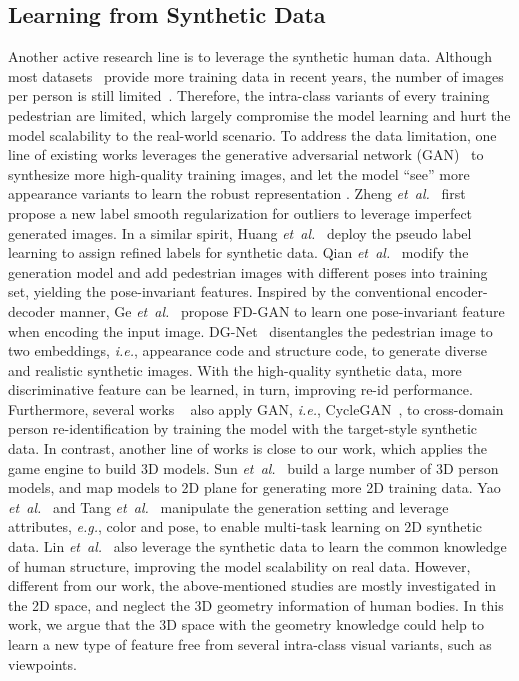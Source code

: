 \documentclass[journal]{IEEEtran}
\def\eg{\emph{e.g.}}
\def\ie{\emph{i.e.}}
\def\etal{\emph{et~al.}}
\begin{document}
\subsection{Learning from Synthetic Data}
Another active research line is to leverage the synthetic human data. Although most datasets~\cite{zheng2015scalable,ristani2016performance} provide more training data in recent years, the number of images per person is still limited~\cite{zheng2017unlabeled}. Therefore, the intra-class variants of every training pedestrian are limited, which largely compromise the model learning and hurt the model scalability to the real-world scenario. To address the data limitation, one line of existing works leverages the generative adversarial network (GAN)~\cite{goodfellow2014generative} to synthesize more high-quality training images, and let the model ``see'' more appearance variants to learn the robust representation \cite{zheng2019joint,ge2018fd,eom2019learning,qian2018pose,zheng2017unlabeled,liu2018pose,zhong2018camera,zou2020joint}. Zheng \etal~\cite{zheng2017unlabeled} first propose a new label smooth regularization for outliers to leverage imperfect generated images. In a similar spirit, Huang \etal~\cite{huang2018multi} deploy the pseudo label learning to assign refined labels for synthetic data. Qian \etal~\cite{qian2018pose} modify the generation model and add pedestrian images with different poses into training set, yielding the pose-invariant features. 
Inspired by the conventional encoder-decoder manner, Ge \etal~\cite{ge2018fd} propose FD-GAN to learn one pose-invariant feature when encoding the input image. DG-Net~\cite{zheng2019joint} disentangles the pedestrian image to two embeddings, \ie, appearance code and structure code, to generate diverse and realistic synthetic images. With the high-quality synthetic data, more discriminative feature can be learned, in turn, improving re-id performance. 
Furthermore, several works ~\cite{deng2018image,zhong2018camera,zhong2020learning,wang2019learning,wei2018person} also apply GAN, \ie, CycleGAN~\cite{CycleGAN2017}, to cross-domain person re-identification by training the model with the target-style synthetic data.
In contrast, another line of works \cite{sun2019dissecting,tang2019pamtri,yao2019simulating} is close to our work, which applies the game engine to build 3D models. Sun \etal~\cite{sun2019dissecting} build a large number of 3D person models, and map models to 2D plane for generating more 2D training data. Yao \etal~\cite{yao2019simulating} and Tang \etal~\cite{tang2019pamtri} manipulate the generation setting and leverage attributes, \eg, color and pose, to enable multi-task learning on 2D synthetic data. 
Lin \etal~\cite{lin2020cross} also leverage the synthetic data to learn the common knowledge of human structure, improving the model scalability on real data. However, different from our work, the above-mentioned studies are mostly investigated in the 2D space, and neglect the 3D geometry information of human bodies. In this work, we argue that the 3D space with the geometry knowledge could help to learn a new type of feature free from several intra-class visual variants, such as viewpoints.
\end{document}
